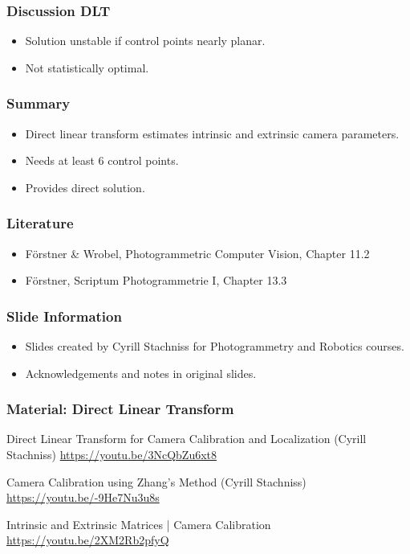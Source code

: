 \begin{frame}
  \frametitle{Discussion DLT}
  \begin{itemize}
    \item Solution unstable if control points nearly planar.
    \item Not statistically optimal.
  \end{itemize}
\end{frame}

\begin{frame}
  \frametitle{Summary}
  \begin{itemize}
    \item Direct linear transform estimates intrinsic and extrinsic camera parameters.
    \item Needs at least 6 control points.
    \item Provides direct solution.
  \end{itemize}
\end{frame}

\begin{frame}
  \frametitle{Literature}
  \begin{itemize}
    \item Förstner \& Wrobel, Photogrammetric Computer Vision, Chapter 11.2
    \item Förstner, Scriptum Photogrammetrie I, Chapter 13.3
  \end{itemize}
\end{frame}

\begin{frame}
  \frametitle{Slide Information}
  \begin{itemize}
    \item Slides created by Cyrill Stachniss for Photogrammetry and Robotics courses.
    \item Acknowledgements and notes in original slides.
  \end{itemize}
\end{frame}

\begin{frame}
  \frametitle{Material: Direct Linear Transform}

  Direct Linear Transform for Camera Calibration and Localization (Cyrill Stachniss)
  \url{https://youtu.be/3NcQbZu6xt8}

  Camera Calibration using Zhang's Method (Cyrill Stachniss)
  \url{https://youtu.be/-9He7Nu3u8s}

  Intrinsic and Extrinsic Matrices | Camera Calibration
  \url{https://youtu.be/2XM2Rb2pfyQ}

\end{frame}
